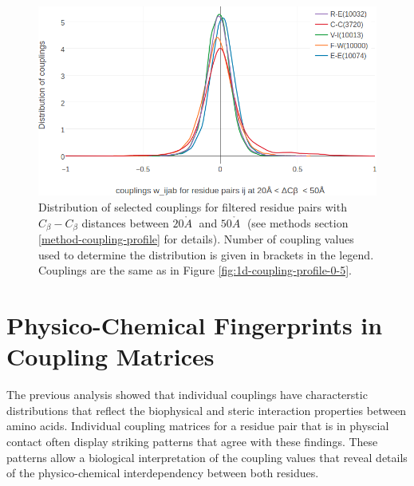 \documentclass[11pt,a4paper,twoside]{book}
\newcommand{\Cb}{C_\beta}
\newcommand{\angstrom}{\mathring{A} \;}
\theoremstyle{definition}
\theoremstyle{definition}
\theoremstyle{remark}
\begin{document}
\begin{figure}
\includegraphics[width=1\linewidth]{img/coupling_matrix_analysis/1d_coupling_profile_20_50} \caption{Distribution of selected
couplings for filtered residue pairs with \(\Cb-\Cb\) distances between
\(20\angstrom\) and \(50\angstrom\) (see methods section
\ref{method-coupling-profile} for details). Number of coupling values
used to determine the distribution is given in brackets in the legend.
Couplings are the same as in Figure \ref{fig:1d-coupling-profile-0-5}.}\label{fig:1d-coupling-profile-20-50}
\end{figure}

\section{Physico-Chemical Fingerprints in Coupling
Matrices}\label{physico-chemical-fingerprints-in-coupling-matrices}

The previous analysis showed that individual couplings have
characterstic distributions that reflect the biophysical and steric
interaction properties between amino acids. Individual coupling matrices
for a residue pair that is in physcial contact often display striking
patterns that agree with these findings. These patterns allow a
biological interpretation of the coupling values that reveal details of
the physico-chemical interdependency between both residues.
\end{document}
